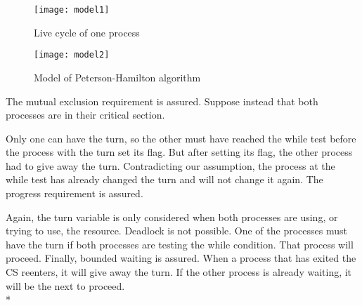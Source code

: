 \begin{figure}[h!]
\centering
\texttt{[image: model1]}
\caption{Live cycle of one process}
\label{fig:model1}
\end{figure}

\begin{figure}[!ht]
\centering
\texttt{[image: model2]}
\caption{Model of Peterson-Hamilton algorithm}
\label{fig:model2}
\end{figure}

The mutual exclusion requirement is assured. Suppose instead that both processes are in their critical section. 

Only one can have the turn, so the other must have reached the while test before the process with the turn set its flag. 
But after setting its flag, the other process had to give away the turn. 
Contradicting our assumption, the process at the while test has already changed the turn and will not change it again.
	The progress requirement is assured. 
	
	Again, the turn variable is only considered when both processes are using, or trying to use, the resource.
	Deadlock is not possible. One of the processes must have the turn if both processes are testing the while condition. 
	That process will proceed.
	Finally, bounded waiting is assured. When a process that has exited the CS reenters, it will give away the turn. 
	If the other process is already waiting, it will be the next to proceed.\\*

